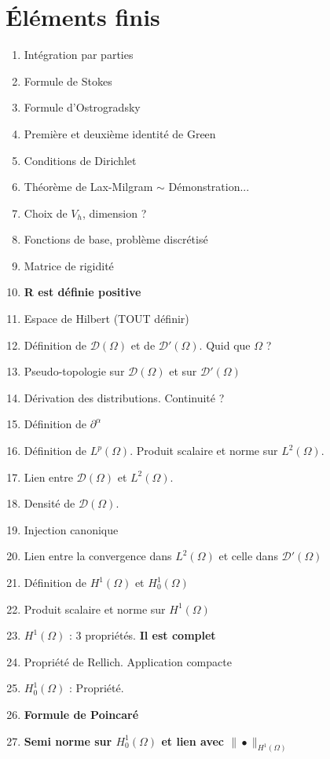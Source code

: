 \documentclass{article}
\begin{document}
\part{\'El\'ements finis}
\begin{enumerate}
\item Intégration par parties
\item Formule de Stokes
\item Formule d'Ostrogradsky
\item Première et deuxième identité de Green
\item Conditions de Dirichlet
\item Théorème de Lax-Milgram $\sim$ Démonstration...
\item Choix de $V_h$, dimension ?
\item Fonctions de base, problème discrétisé
\item Matrice de rigidité
\item \textbf{R est définie positive}
\item Espace de Hilbert (TOUT définir)
\item Définition de $\mathcal{D}(\Omega)$ et de $\mathcal{D}'(\Omega)$. Quid que $\Omega$ ?
\item Pseudo-topologie sur $\mathcal{D}(\Omega)$ et sur $\mathcal{D}'(\Omega)$
\item Dérivation des distributions. Continuité ?
\item Définition de $\partial^\alpha$
\item Définition de $L^p(\Omega)$. Produit scalaire et norme sur $L^2(\Omega)$. 
\item Lien entre $\mathcal{D}(\Omega)$ et $L^2(\Omega)$. 
\item Densité de $\mathcal{D}(\Omega)$. 
\item Injection canonique
\item Lien entre la convergence dans $L^2(\Omega)$ et celle dans $\mathcal{D}'(\Omega)$
\item Définition de $H^1(\Omega)$ et $H_0^1(\Omega)$
\item Produit scalaire et norme sur $H^1(\Omega)$
\item $H^1(\Omega)$ : 3 propriétés. \textbf{Il est complet}
\item Propriété de Rellich. Application compacte
\item $H^1_0(\Omega)$ : Propriété.
\item \textbf{Formule de Poincaré}
\item \textbf{Semi norme sur $H_0^1(\Omega)$ et lien avec $\|\bullet\|_{H^1(\Omega)}$}

\end{enumerate}
\end{document}
